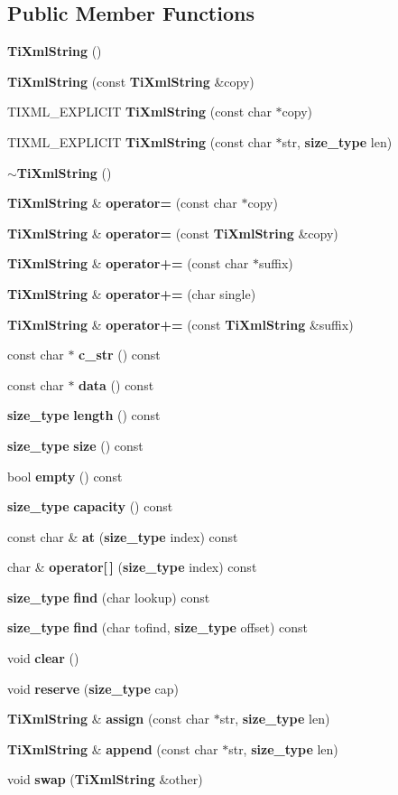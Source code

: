 \subsection*{Public Member Functions}
\begin{CompactItemize}
\item 
{\bf TiXmlString} ()
\item 
{\bf TiXmlString} (const {\bf TiXmlString} \&copy)
\item 
TIXML\_\-EXPLICIT {\bf TiXmlString} (const char $\ast$copy)
\item 
TIXML\_\-EXPLICIT {\bf TiXmlString} (const char $\ast$str, {\bf size\_\-type} len)
\item 
{\bf $\sim$TiXmlString} ()
\item 
{\bf TiXmlString} \& {\bf operator=} (const char $\ast$copy)
\item 
{\bf TiXmlString} \& {\bf operator=} (const {\bf TiXmlString} \&copy)
\item 
{\bf TiXmlString} \& {\bf operator+=} (const char $\ast$suffix)
\item 
{\bf TiXmlString} \& {\bf operator+=} (char single)
\item 
{\bf TiXmlString} \& {\bf operator+=} (const {\bf TiXmlString} \&suffix)
\item 
const char $\ast$ {\bf c\_\-str} () const 
\item 
const char $\ast$ {\bf data} () const 
\item 
{\bf size\_\-type} {\bf length} () const 
\item 
{\bf size\_\-type} {\bf size} () const 
\item 
bool {\bf empty} () const 
\item 
{\bf size\_\-type} {\bf capacity} () const 
\item 
const char \& {\bf at} ({\bf size\_\-type} index) const 
\item 
char \& {\bf operator[$\,$]} ({\bf size\_\-type} index) const 
\item 
{\bf size\_\-type} {\bf find} (char lookup) const 
\item 
{\bf size\_\-type} {\bf find} (char tofind, {\bf size\_\-type} offset) const 
\item 
void {\bf clear} ()
\item 
void {\bf reserve} ({\bf size\_\-type} cap)
\item 
{\bf TiXmlString} \& {\bf assign} (const char $\ast$str, {\bf size\_\-type} len)
\item 
{\bf TiXmlString} \& {\bf append} (const char $\ast$str, {\bf size\_\-type} len)
\item 
void {\bf swap} ({\bf TiXmlString} \&other)
\end{CompactItemize}

